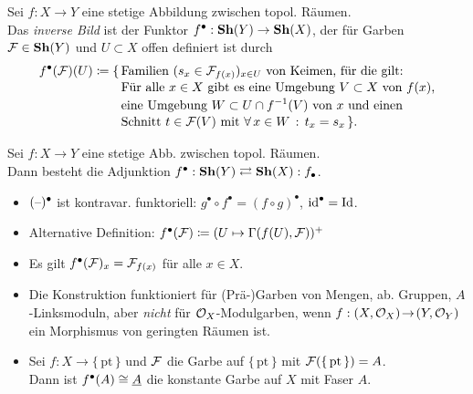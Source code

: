 \documentclass{cheat-sheet}
\newcommand{\pt}{\{ \, \mathrm{pt} \, \}} %
\begin{document}

\begin{defn}
  Sei $f : X \to Y$ eine stetige Abbildung zwischen topol. Räumen. \\
  Das \emph{inverse Bild} ist der Funktor $f^\bullet : \mathbf{Sh}(Y) \to \mathbf{Sh}(X)$, der für Garben $\mathcal{F} \in \mathbf{Sh}(Y)$ und $U \subset X$ offen definiert ist durch
  \begin{align*}
    f^\bullet(\mathcal{F})(U) \coloneqq \{ \, & \text{Familien $(s_x \in \mathcal{F}_{f(x)})_{x \in U}$ von Keimen, für die gilt:} \\[-2pt]
    & \text{Für alle $x \in X$ gibt es eine Umgebung $V \subset X$ von $f(x)$,} \\[-2pt]
    & \text{eine Umgebung $W \subset U \cap f^{-1}(V)$ von $x$ und einen} \\[-2pt]
    & \text{Schnitt $t \in \mathcal{F}(V)$ mit $\forall \, {x \in W} \,:\, t_x = s_x$} \, \}.
  \end{align*}
\end{defn}

\begin{prop}
  Sei $f : X \to Y$ eine stetige Abb. zwischen topol. Räumen. \\
  Dann besteht die Adjunktion \enspace $f^\bullet : \mathbf{Sh}(Y) \rightleftarrows \mathbf{Sh}(X) : f_\bullet$.
\end{prop}

\begin{bem}
  \begin{itemize}
    \item $(\text{--})^\bullet$ ist kontravar. funktoriell: $g^\bullet \circ f^\bullet = (f \circ g)^\bullet$, $\operatorname{id}^\bullet = \operatorname{Id}$.
    \item Alternative Definition: $f^\bullet(\mathcal{F}) \coloneqq (U \mapsto \Gamma(f(U), \mathcal{F}))^+$
    \item Es gilt $f^\bullet(\mathcal{F})_x = \mathcal{F}_{f(x)}$ für alle $x \in X$.
    \item Die Konstruktion funktioniert für (Prä-)Garben von Mengen, ab. Gruppen, $A$-Linksmoduln, aber {\em nicht} für $\mathcal{O}_X$-Modulgarben, wenn $f : (X, \mathcal{O}_X) \!\to\! (Y, \mathcal{O}_Y)$ ein Morphismus von geringten Räumen ist.
    \item Sei $f : X \to \pt$ und $\mathcal{F}$ die Garbe auf $\pt$ mit $\Fais(\pt) = A$. \\
    Dann ist $f^\bullet(A) \cong \underline{A}$ die konstante Garbe auf $X$ mit Faser $A$.
  \end{itemize}
\end{bem}
\end{document}
